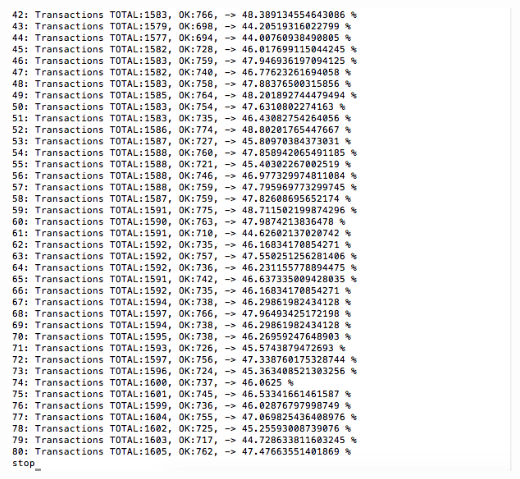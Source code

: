 \documentclass[a4paper, 11pt]{article}
\begin{document}
\begin{itemize}
\includegraphics[scale=0.4]{images/exp-i-6b.png} \\
\end{itemize}
\end{document}
